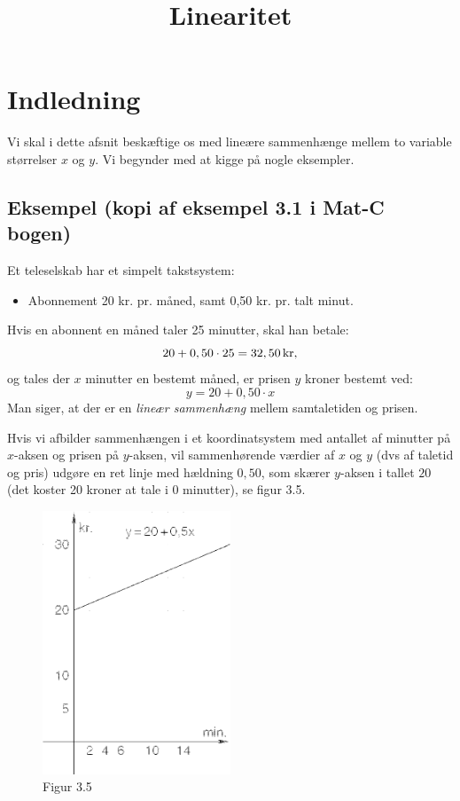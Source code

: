 \documentclass[12pt,oneside,a4paper]{article}
\title{Linearitet}
\begin{document}
\maketitle

\section{Indledning}
Vi skal i dette afsnit beskæftige os med lineære sammenhænge mellem to variable
størrelser $x$ og $y$.  Vi begynder med at kigge på nogle eksempler.

\subsection{Eksempel (kopi af eksempel 3.1 i Mat-C bogen)}
Et teleselskab har et simpelt takstsystem:
\begin{itemize}
    \item Abonnement 20 kr. pr. måned, samt 0,50 kr. pr. talt minut.
\end{itemize}
Hvis en abonnent en måned taler 25 minutter, skal han betale:
$$
20 + 0,50\cdot25 = 32,50 \, {\rm kr},
$$
og tales der $x$ minutter en bestemt måned, er prisen $y$ kroner bestemt ved:
$$
y = 20 + 0,50\cdot x
$$
Man siger, at der er en {\em lineær sammenhæng} mellem samtaletiden og prisen.

Hvis vi afbilder sammenhængen i et koordinatsystem med antallet af minutter på
$x$-aksen og prisen på $y$-aksen, vil sammenhørende værdier af $x$ og $y$ (dvs
af taletid og pris) udgøre en ret linje med hældning $0,50$, som skærer
$y$-aksen i tallet $20$ (det koster 20 kroner at tale i 0 minutter), se figur
3.5.

\begin{figure}[ht]
    \centering
    \includegraphics[width=0.5\textwidth]{fig35}
    \caption{Figur 3.5}
    \label{fig35}
\end{figure}
\end{document}
